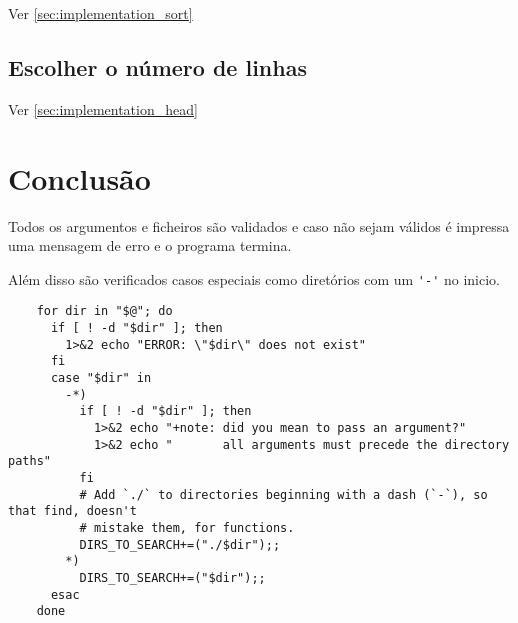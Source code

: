 Ver \ref{sec:implementation_sort}

\subsection{Escolher o número de linhas}

Ver \ref{sec:implementation_head}


\section{Conclusão}

Todos os argumentos e ficheiros são validados e caso não sejam válidos é impressa uma mensagem de erro e o programa termina.

Além disso são verificados casos especiais como diretórios com um \Verb|'-'| no inicio.

\begin{listing}[H]
	\centering
	\begin{verbatim}
    for dir in "$@"; do
      if [ ! -d "$dir" ]; then
        1>&2 echo "ERROR: \"$dir\" does not exist"
      fi
      case "$dir" in
        -*)
          if [ ! -d "$dir" ]; then
            1>&2 echo "+note: did you mean to pass an argument?"
            1>&2 echo "       all arguments must precede the directory paths"
          fi
          # Add `./` to directories beginning with a dash (`-`), so that find, doesn't
          # mistake them, for functions.
          DIRS_TO_SEARCH+=("./$dir");;
        *)
          DIRS_TO_SEARCH+=("$dir");;
      esac
    done
  \end{verbatim}
\end{listing}
